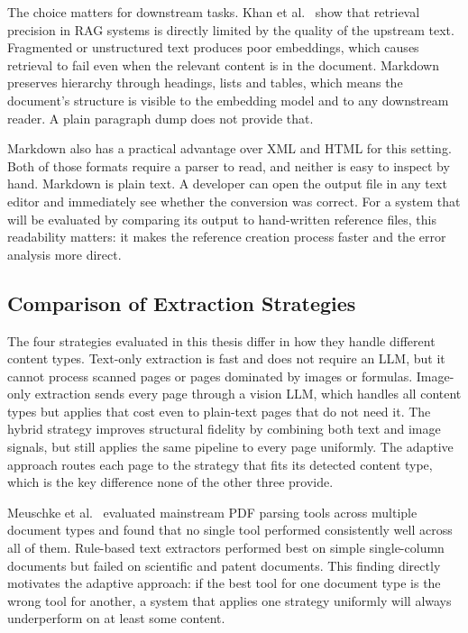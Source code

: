 The choice matters for downstream tasks. Khan et al.\ \autocite{khan2024} show
that retrieval precision in RAG systems is directly limited by the quality of
the upstream text. Fragmented or unstructured text produces poor embeddings,
which causes retrieval to fail even when the relevant content is in the document.
Markdown preserves hierarchy through headings, lists and tables, which means
the document's structure is visible to the embedding model and to any downstream
reader. A plain paragraph dump does not provide that.

Markdown also has a practical advantage over XML and HTML for this setting.
Both of those formats require a parser to read, and neither is easy to inspect
by hand. Markdown is plain text. A developer can open the output file in any
text editor and immediately see whether the conversion was correct. For a
system that will be evaluated by comparing its output to hand-written reference
files, this readability matters: it makes the reference creation process
faster and the error analysis more direct.

\subsection{Comparison of Extraction Strategies}

The four strategies evaluated in this thesis differ in how they handle
different content types. Text-only extraction is fast and does not require
an LLM, but it cannot process scanned pages or pages dominated by images
or formulas. Image-only extraction sends every page through a vision LLM,
which handles all content types but applies that cost even to plain-text
pages that do not need it. The hybrid strategy improves structural fidelity
by combining both text and image signals, but still applies the same pipeline
to every page uniformly. The adaptive approach routes each page to the
strategy that fits its detected content type, which is the key difference
none of the other three provide.

Meuschke et al.\ \autocite{meuschke2023} evaluated mainstream PDF parsing tools
across multiple document types and found that no single tool performed
consistently well across all of them. Rule-based text extractors performed best
on simple single-column documents but failed on scientific and patent documents.
This finding directly motivates the adaptive approach: if the best tool for one
document type is the wrong tool for another, a system that applies one strategy
uniformly will always underperform on at least some content.

